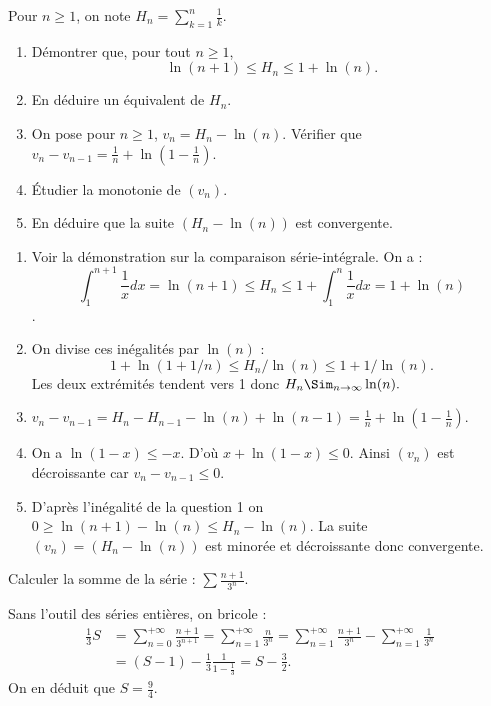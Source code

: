 \documentclass{book}
\begin{document}
\begin{Exercice}
Pour $n\geq 1$, on note $H_n=\sum_{k=1}^n \frac 1k$. 
\begin{enumerate}
\item Démontrer que, pour tout $n\geq 1$, 
$$\ln(n+1)\leq H_n\leq 1+\ln(n).$$
\item En déduire un équivalent de $H_n$.
\item On pose pour $n\geq 1$, $v_n=H_n-\ln(n)$. Vérifier que $v_{n}-v_{n-1}=\frac 1n+\ln\left(1-\frac 1n\right)$.
\item \'Etudier la monotonie de $(v_n)$.
\item En déduire que la suite $(H_n-\ln(n))$ est convergente.
\end{enumerate}
          
\begin{Correction}
    \begin{enumerate}
        \item Voir la démonstration sur la comparaison série-intégrale. On a :
$$ \int_{1}^{n+1}\frac{1}{x}dx=\ln(n+1) \leq H_n \leq 1 + \int_{1}^{n}\frac{1}{x}dx=1 + \ln(n)$$.
\item On divise ces inégalités par $\ln(n)$ :
$$1 + \ln(1+1/n) \leq H_n/\ln(n) \leq 1+1/\ln(n).$$
Les deux extrémités tendent vers 1 donc   $H_n \Sim_{n\to\infty} \ln(n).$
\item $v_{n}-v_{n-1}=H_n-H_{n-1}-  \ln(n) + \ln(n-1)= \frac{1}{n}+\ln\left(1-\frac 1n\right).$
\item On a $\ln(1-x)\leq -x$. D'où $x+\ln(1-x)\leq 0$. Ainsi $(v_n)$ est décroissante car $v_{n}-v_{n-1}\leq 0$. 
\item D'après l'inégalité de la question 1 on $0\geq \ln(n+1)-\ln(n)\leq H_n - \ln(n)$. La suite $(v_n)=(H_n-\ln(n))$ est minorée et décroissante donc convergente.
  \end{enumerate}      

\end{Correction}
\end{Exercice}


\begin{Exercice}
Calculer la somme de la série : $\sum \frac{n+1}{3^n}.$
\begin{Correction}
Sans l'outil des séries entières, on bricole :
$$\begin{aligned}
\frac{1}{3}S&=\sum_{n=0}^{+\infty}\frac{n+1}{3^{n+1}}=\sum_{n=1}^{+\infty}\frac{n}{3^{n}}=\sum_{n=1}^{+\infty}\frac{n+1}{3^{n}}-\sum_{n=1}^{+\infty}\frac{1}{3^{n}}\\
 &=(S-1)-\frac{1}{3}\frac{1}{1-\frac{1}{3}}=S-\frac{3}{2}.
\end{aligned}$$
On en déduit que $S=\frac{9}{4}.$
\end{Correction}
\end{Exercice}
\end{document}
